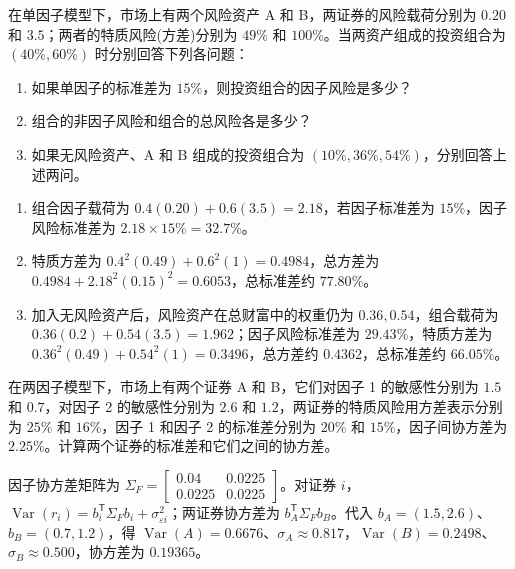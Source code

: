 \begin{problem}
 在单因子模型下，市场上有两个风险资产 A 和 B，两证券的风险载荷分别为 $0.20$ 和 $3.5$；两者的特质风险(方差)分别为 $49\%$ 和 $100\%$。当两资产组成的投资组合为 $(40\%,60\%)$ 时分别回答下列各问题：
\begin{enumerate}[label=(\alph*)]
    \item 如果单因子的标准差为 $15\%$，则投资组合的因子风险是多少？
    \item 组合的非因子风险和组合的总风险各是多少？
    \item 如果无风险资产、A 和 B 组成的投资组合为 $(10\%,36\%,54\%)$，分别回答上述两问。
\end{enumerate}
\end{problem}
\begin{solution}
\begin{enumerate}[label=(\alph*)]
\item 组合因子载荷为 $0.4(0.20)+0.6(3.5)=2.18$，若因子标准差为 $15\%$，因子风险标准差为 $2.18\times15\%=32.7\%$。
\item 特质方差为 $0.4^2(0.49)+0.6^2(1)=0.4984$，总方差为 $0.4984+2.18^2(0.15)^2=0.6053$，总标准差约 $77.80\%$。
\item 加入无风险资产后，风险资产在总财富中的权重仍为 $0.36,0.54$，组合载荷为 $0.36(0.2)+0.54(3.5)=1.962$；因子风险标准差为 $29.43\%$，特质方差为 $0.36^2(0.49)+0.54^2(1)=0.3496$，总方差约 $0.4362$，总标准差约 $66.05\%$。
\end{enumerate}
\end{solution}
\begin{problem}
 在两因子模型下，市场上有两个证券 A 和 B，它们对因子 1 的敏感性分别为 $1.5$ 和 $0.7$，对因子 2 的敏感性分别为 $2.6$ 和 $1.2$，两证券的特质风险用方差表示分别为 $25\%$ 和 $16\%$，因子 1 和因子 2 的标准差分别为 $20\%$ 和 $15\%$，因子间协方差为 $2.25\%$。计算两个证券的标准差和它们之间的协方差。
\end{problem}
\begin{solution}
因子协方差矩阵为 $\Sigma_F=\begin{bmatrix}0.04&0.0225\\0.0225&0.0225\end{bmatrix}$。对证券 $i$，$\operatorname{Var}(r_i)=b_i^{\mathsf T}\Sigma_Fb_i+\sigma_{\varepsilon i}^2$；两证券协方差为 $b_A^{\mathsf T}\Sigma_Fb_B$。代入 $b_A=(1.5,2.6)$、$b_B=(0.7,1.2)$，得 $\operatorname{Var}(A)=0.6676$、$\sigma_A\approx0.817$，$\operatorname{Var}(B)=0.2498$、$\sigma_B\approx0.500$，协方差为 $0.19365$。
\end{solution}
